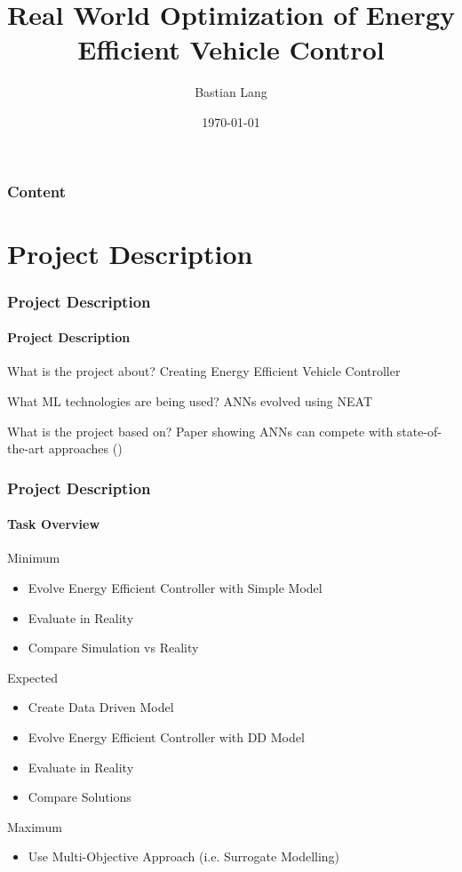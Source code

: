 \documentclass[8pt]{beamer}
\title[Energy Efficient Vehicle Control]{Real World Optimization of Energy Efficient Vehicle Control}
\subtitle[Current State]{}
\author{Bastian Lang} %
\institute[BRSU] %
{
Bonn-Rhein-Sieg University of Applied Science \\ %
}
\date{\today}
\begin{document}
\listoffigures

\begin{frame}
	\titlepage
\end{frame}

\begin{frame}
	\frametitle{Content}
	\tableofcontents[hideallsubsections]
\end{frame}

\section{Project Description}
\begin{frame}
	\frametitle{Project Description}
	\framesubtitle{Project Description}
	\begin{block}{What is the project about?}
		Creating Energy Efficient Vehicle Controller  
	\end{block}	
	\pause	
	\begin{block}{What ML technologies are being used?}
		ANNs evolved using NEAT
	\end{block}
	\pause
	\begin{block}{What is the project based on?}	
		Paper showing ANNs can compete with state-of-the-art approaches (\cite{gaier2014evolving})
	\end{block}
\end{frame}

\begin{frame}
	\frametitle{Project Description}
	\framesubtitle{Task Overview}
	\begin{block}{Minimum}
	\begin{itemize}[<+->]
		\item Evolve Energy Efficient Controller with Simple Model
		\item Evaluate in Reality 
		\item Compare Simulation vs Reality
	\end{itemize}
	\end{block}	
	\pause
	
	\begin{block}{Expected}
	\begin{itemize}[<+->]
		\item Create Data Driven Model 
		\item Evolve Energy Efficient Controller with DD Model
		\item Evaluate in Reality
		\item Compare Solutions		
	\end{itemize}
	\end{block}	
	\pause
	
	\begin{block}{Maximum}
	\begin{itemize}[<+->]
		\item Use Multi-Objective Approach (i.e. Surrogate Modelling)
	\end{itemize}
	\end{block}
	
\end{frame}
\end{document}
